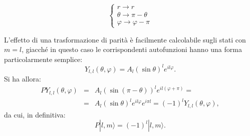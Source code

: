 \documentclass[a4paper,12pt,oneside]{book}
\begin{document}
\begin{center}
\begin{minipage}[c]{0.35\textwidth}
\centering
\begin{equation}
\begin{cases} \nonumber
r \to r \\
\theta \to \pi-\theta \\
\varphi \to \varphi-\pi
\end{cases}
\end{equation}
\end{minipage}
\begin{minipage}{0.50\textwidth}
\centering
{}
%
%
\end{minipage}
\end{center}
L'effetto di una trasformazione di parità è facilmente calcolabile sugli stati con $m=l$, giacché in questo caso le corrispondenti autofunzioni hanno una forma particolarmente semplice:
\begin{equation} 
Y_{l,l}(\theta, \varphi)=A_l \left( \sin \theta \right)^l e^{il\varphi}.
\end{equation}
Si ha allora:
\begin{eqnarray} 
PY_{l,l}(\theta, \varphi) & = & A_l \left( \sin (\pi -\theta) \right)^l e^{il(\varphi+\pi)}= \nonumber \\
 & =  &A_l \left( \sin \theta \right)^l e^{il\varphi} e^{i \pi l}= (-1)^l Y_{l,l}(\theta, \varphi),
\end{eqnarray}
da cui, in definitiva:
\begin{equation} 
P|l,m\rangle= (-1)^l |l,m \rangle.
\end{equation}
\end{document}
